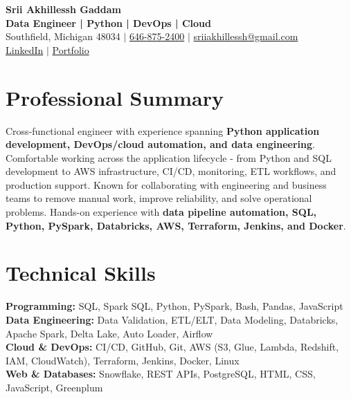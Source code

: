 \documentclass[letterpaper,10pt]{article}
\begin{document}
\fontsize{9.35pt}{10.45pt}\selectfont

\begin{center}
    {\LARGE \textbf{Srii Akhillessh Gaddam}} \\[-1pt]
    \textbf{Data Engineer | Python | DevOps | Cloud} \\[2pt]
    Southfield, Michigan 48034 $|$
    \href{tel:6468752400}{646-875-2400} $|$
    \href{mailto:sriiakhillessh@gmail.com}{sriiakhillessh@gmail.com} \\[1pt]
    \href{https://www.linkedin.com/in/srii-akhiilessh-gaddam-b48668191/}{LinkedIn} $|$
    \href{https://sriiakhillesshg.github.io/portfolio/}{Portfolio}
\end{center}
\vspace{-8pt}

\section{Professional Summary}
\small{Cross-functional engineer with experience spanning \textbf{Python application development, DevOps/cloud automation, and data engineering}. Comfortable working across the application lifecycle - from Python and SQL development to AWS infrastructure, CI/CD, monitoring, ETL workflows, and production support. Known for collaborating with engineering and business teams to remove manual work, improve reliability, and solve operational problems. Hands-on experience with \textbf{data pipeline automation, SQL, Python, PySpark, Databricks, AWS, Terraform, Jenkins, and Docker}.}

\section{Technical Skills}
\small{
\textbf{Programming:} SQL, Spark SQL, Python, PySpark, Bash, Pandas, JavaScript \\
\textbf{Data Engineering:} Data Validation, ETL/ELT, Data Modeling, Databricks, Apache Spark, Delta Lake, Auto Loader, Airflow \\
\textbf{Cloud \& DevOps:} CI/CD, GitHub, Git, AWS (S3, Glue, Lambda, Redshift, IAM, CloudWatch), Terraform, Jenkins, Docker, Linux \\
\textbf{Web \& Databases:} Snowflake, REST APIs, PostgreSQL, HTML, CSS, JavaScript, Greenplum
}

\end{document}
